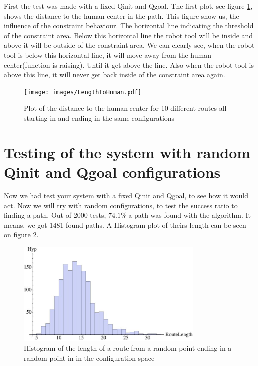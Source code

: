 First the test was made with a fixed Qinit and Qgoal. The first plot, see figure \ref{fig:l2h}, shows the distance to the human center in the path. This figure show us, the influence of the constraint behaviour. The horizontal line indicating the threshold of the constraint area. Below this horizontal line the robot tool will be inside and above it will be outside of the constraint area. We can clearly see, when the robot tool is below this horizontal line, it will move away from the human center(function is raising). Until it get above the line. Also when the robot tool is above this line, it will never get back inside of the constraint area again. 

\begin{figure}[h!]
 \centering
 \texttt{[image: images/LengthToHuman.pdf]}
 \caption{Plot of the distance to the human center for 10 different routes all starting in and ending in the same configurations}
 \label{fig:l2h}
\end{figure}

\section{Testing of the system with random Qinit and Qgoal configurations}
Now we had test your system with a fixed Qinit and Qgoal, to see how it would act. Now we will try with random configurations, to test the success ratio to finding a path.
Out of 2000 tests, $74.1\%$ a path was found with the algorithm. It means, we got 1481 found paths. A Histogram plot of theirs length can be seen on figure \ref{fig:hyp}. 

\begin{figure}[h!]
 \centering
 \includegraphics[width=0.8\textwidth]{images/Hyp.jpg}
 \caption{Histogram of the length of a route from a random point ending in a random point in in the configuration space}
 \label{fig:hyp}
\end{figure}

